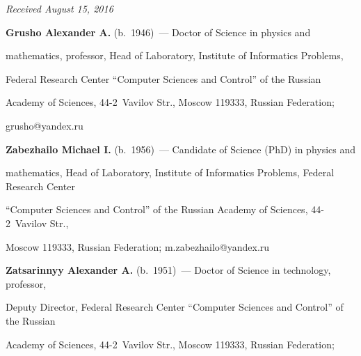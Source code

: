 \vspace*{-3pt}





\hfill{\small\textit{Received August 15, 2016}}





 \Contr





\noindent


\textbf{Grusho Alexander A.} (b.\ 1946)~--- Doctor of Science in physics and 


mathematics, professor, Head of Laboratory, Institute of Informatics Problems, 


Federal Research Center ``Computer Sciences and Control'' of the Russian 


Academy of Sciences, 44-2~Vavilov Str., Moscow 119333, Russian Federation; 


\mbox{grusho@yandex.ru}





\vspace*{3pt}


   


\noindent


\textbf{Zabezhailo Michael I.} (b.\ 1956)~--- Candidate of Science (PhD) in physics and 


mathematics, Head of Laboratory, Institute of Informatics Problems, Federal Research Center 


``Computer Sciences and Control'' of the Russian Academy of Sciences, 44-2~Vavilov Str., 


Moscow 119333, Russian Federation; \mbox{m.zabezhailo@yandex.ru}   





\vspace*{3pt}


   


\noindent


\textbf{Zatsarinnyy Alexander A.} (b.\ 1951)~--- Doctor of Science in technology, professor, 


Deputy Director, Federal Research Center ``Computer Sciences and Control'' of the Russian 


Academy of Sciences, 44-2~Vavilov Str., Moscow 119333, Russian Federation; 


